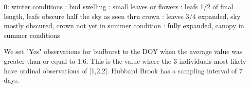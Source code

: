 \documentclass[a4paper,12pt]{article}
\begin{document}
0: winter conditions : bud swelling : small leaves or flowers : leafs 1/2 of final length, leafs obscure half the sky as seen thru crown : leaves 3/4 expanded, sky mostly obscured, crown not yet in summer condition : fully expanded, canopy in summer conditions \newline

We set "Yes" observations for budburst to the DOY when the average value was greater than or equal to 1.6. This is the value where the 3 individuals most likely have ordinal observations of [1,2,2]. Hubbard Brook has a sampling interval of 7 days.
\end{document}
